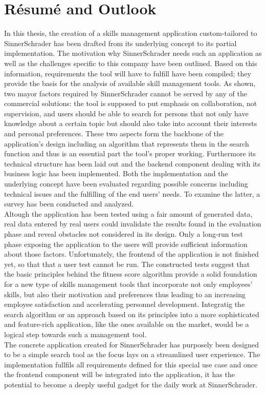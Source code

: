 \chapter{Résumé and Outlook}
In this thesis, the creation of a skills management application custom-tailored to SinnerSchrader has been drafted from its underlying concept to its partial implementation. The motivation why SinnerSchrader needs such an application as well as the challenges specific to this company have been outlined. Based on this information, requirements the tool will have to fulfill have been compiled; they provide the basis for the analysis of available skill management tools. As shown, two mayor factors required by SinnerSchrader cannot be served by any of the commercial solutions: the tool is supposed to put emphasis on collaboration, not supervision, and users should be able to search for persons that not only have knowledge about a certain topic but should also take into account their interests and personal preferences.
These two aspects form the backbone of the application's design including an algorithm that represents them in the search function and thus is an essential part the tool's proper working.
Furthermore its technical structure has been laid out and the backend component dealing with its business logic has been implemented.
Both the implementation and the underlying concept have been evaluated regarding possible concerns including technical issues and the fulfilling of the end users' needs. To examine the latter, a survey has been conducted and analyzed.\\
Altough the application has been tested using a fair amount of generated data, real data entered by real users could invalidate the
results found in the evaluation phase and reveal obstacles not considered in its design. Only a long-run test phase exposing the application to the users will provide sufficient information about those factors. Unfortunately, the frontend of the application is not finished yet, so that that a user test cannot be run.
The constructed tests suggest that the basic principles behind the fitness score algorithm provide a solid foundation for a new type of skills management tools that incorporate not only employees' skills, but also their motivation and preferences thus leading to an increasing employee satisfaction and accelerating personnel development.
Integratig the search algorithm or an approach based on its principles into a more sophisticated and feature-rich application, like the ones available on the market, would be a logical step towards such a management tool. \\
The concrete application created for SinnerSchrader has purposely been designed to be a simple search tool as the focus lays on a streamlined user experience. The implementation fullfils all requirements defined for this special use case and once the frontend component will be integrated into the application, it has the potential to become a deeply useful gadget for the daily work at SinnerSchrader.
